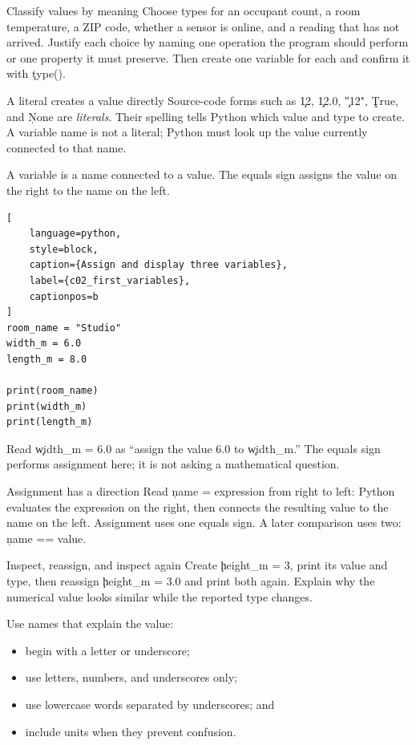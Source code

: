 \begin{TryBox}{Classify values by meaning}
Choose types for an occupant count, a room temperature, a ZIP code, whether a
sensor is online, and a reading that has not arrived. Justify each choice by
naming one operation the program should perform or one property it must
preserve. Then create one variable for each and confirm it with \c{type()}.
\end{TryBox}

\begin{SyntaxBox}{A literal creates a value directly}
Source-code forms such as \c{12}, \c{12.0}, \c{"12"}, \c{True}, and \c{None}
are \emph{literals}. Their spelling tells Python which value and type to
create. A variable name is not a literal; Python must look up the value
currently connected to that name.
\end{SyntaxBox}


A variable is a name connected to a value. The equals sign assigns the value
on the right to the name on the left.

\begin{lstlisting}[
    language=python,
    style=block,
    caption={Assign and display three variables},
    label={c02_first_variables},
    captionpos=b
]
room_name = "Studio"
width_m = 6.0
length_m = 8.0

print(room_name)
print(width_m)
print(length_m)
\end{lstlisting}

Read \c{width_m = 6.0} as ``assign the value 6.0 to \c{width_m}.'' The equals
sign performs assignment here; it is not asking a mathematical question.

\begin{SyntaxBox}{Assignment has a direction}
Read \c{name = expression} from right to left: Python evaluates the expression
on the right, then connects the resulting value to the name on the left.
Assignment uses one equals sign. A later comparison uses two: \c{name == value}.
\end{SyntaxBox}

\begin{TryBox}{Inspect, reassign, and inspect again}
Create \c{height_m = 3}, print its value and type, then reassign
\c{height_m = 3.0} and print both again. Explain why the numerical value looks
similar while the reported type changes.
\end{TryBox}

Use names that explain the value:
\begin{itemize}
    \item begin with a letter or underscore;
    \item use letters, numbers, and underscores only;
    \item use lowercase words separated by underscores; and
    \item include units when they prevent confusion.
\end{itemize}

